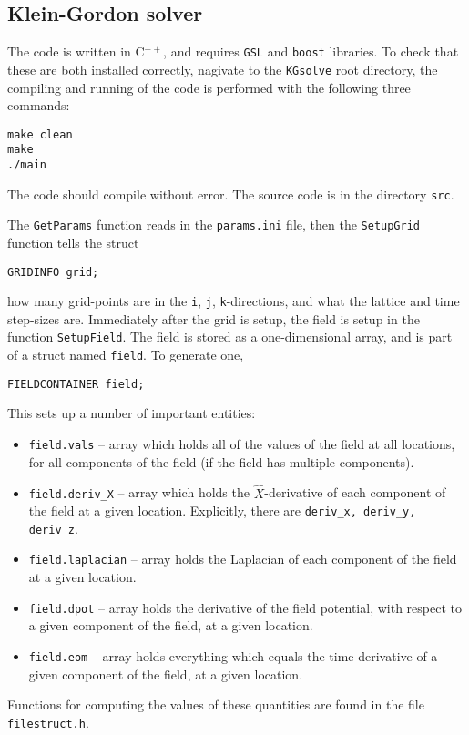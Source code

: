 \documentclass[amsmath,amssymb,12pt, eqsecnum]{revtex4}
\newcommand\codeRed[1]{\textcolor[rgb]{1,0,0}{{\tt #1}}}
\newcommand\codeBlue[1]{\textcolor[rgb]{0,0,1}{{\tt #1}}}
\begin{document}
\subsection{Klein-Gordon solver}
The code is written in C$^{++}$, and requires {\tt GSL} and {\tt boost} libraries. To check that these are both installed correctly, nagivate to the {\tt KGsolve} root directory, the compiling and running of the code is performed with the following three commands:
\begin{verbatim}
make clean
make
./main
\end{verbatim}
The code should compile without error. The source code is in the directory {\tt src}.

The \codeBlue{GetParams} function reads in the {\tt params.ini} file, then the \codeBlue{SetupGrid} function tells the struct
\begin{verbatim}
GRIDINFO grid;
\end{verbatim}
how many grid-points are in the {\tt i}, {\tt j}, {\tt k}-directions, and what the lattice and time step-sizes are. Immediately after the grid is setup, the field is setup in the function \codeBlue{SetupField}. The  field  is stored as a one-dimensional array, and is part of a struct named {\tt field}. To generate one, 
\begin{verbatim}
FIELDCONTAINER field;
\end{verbatim}
This sets up a number of important entities:
\begin{itemize}
\item {\tt field.vals} --    array which holds all of the values of the field at all locations, for all components of the field (if the field has multiple components). 
\item {\tt field.deriv\_X} --    array which holds the $\hat{X}$-derivative of each component of the field at a given location. Explicitly, there are {\tt deriv\_x, deriv\_y, deriv\_z}.
\item {\tt field.laplacian} --   array holds the Laplacian of each component of the field at a given location.
\item {\tt field.dpot} --   array holds the derivative of the field potential, with respect to a given component of the field, at a given location.
\item {\tt field.eom} --   array holds everything which equals the time derivative of a given component of the field, at a given location.
\end{itemize}
Functions for computing the values of these quantities are found in the file \codeRed{filestruct.h}.
\end{document}
